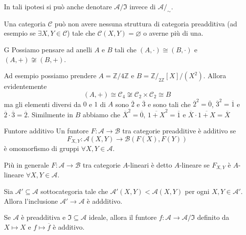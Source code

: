 In tali ipotesi si può anche denotare \(\mathcal{A} / \mathfrak{I}\) invece di
\(\mathcal{A}/_\sim\).

Una categoria \(\mathcal{\mathcal{C}}\) può non avere nessuna struttura di categoria
    preadditiva (ad esempio se \(\exists X, Y \in \mathcal{\mathcal{C}}\)) tale che \(\mathcal{\mathcal{C}}{(X, Y)} = \varnothing\) o averne più di una.

\begin{example}{G}
    Possiamo pensare ad anelli \(A\) e \(B\) tali che \({(A, \cdot )} \cong {(B, \cdot )}\) e \({(A, +)} \not\cong {(B, +)}\).

    Ad esempio possiamo prendere \(A = \mathbb{Z} / 4 \mathbb{Z}\) e \(B = \mathbb{Z} /_{2 \mathbb{Z}} [X] / {(X^2)}\). Allora evidentemente 
    \[
      {(A, +)} \cong \mathcal{C}_4 \not\cong \mathcal{C}_{2} \times \mathcal{C}_{2} \cong B
    \]
    ma gli elementi diversi da \(0\) e \(1\) di \(A\) sono \(\overline{2}\) e \(\overline{3}\) e sono tali che \(\overline{2}^2 = \overline{0}\), \(\overline{3}^2 = \overline{1}\) e \(\overline{2} \cdot \overline{3} = \overline{2}\). Similmente in \(B\) abbiamo che
    \(
      \overline{X}^2 = \overline{0}
    \), \(\overline{1+X}^2 = \overline{1}\) e \(\overline{X} \cdot \overline{1+X} = \overline{X}\)
\end{example}

\begin{definition}{Funtore additivo}
    Un funtore \(F : \mathcal{A} \to \mathcal{B}\) tra categorie preadditive è
    additivo se 
    \[
      F_{X,Y}  : \mathcal{A}{(X, Y)} \to \mathcal{B}{(F{(X)}, F{(Y)})}
    \]
    è omomorfismo di gruppi \(\forall X, Y \in \mathcal{A}\).

    Più in generale \(F: \mathcal{A} \to \mathcal{B}\) tra categorie
    \(A\)-lineari è detto \(A\)-lineare se \(F_{X, Y} \) è \(A\)-lineare \(\forall X, Y \in \mathcal{A}\).
\end{definition}

\begin{example}{}
    Sia \(\mathcal{A}' \subseteq \mathcal{A} \) sottocategoria tale che \(\mathcal{A}'{(X, Y)} < \mathcal{A}{(X,Y)}\) per ogni \(X,Y \in \mathcal{A}'\). Allora l'inclusione \(\mathcal{A}' \to \mathcal{A}\) è addditivo.
\end{example}

\begin{example}{}
    Se \(\mathcal{A}\) è preadditiva e \(\mathfrak{I} \subseteq \mathcal{A} \)
    ideale, allora il funtore \(f : \mathcal{A} \to \mathcal{A}/\mathfrak{I}\) 
    definito da \(X \mapsto X\) e \(f \mapsto \overline{f}\) è additivo.
\end{example}

